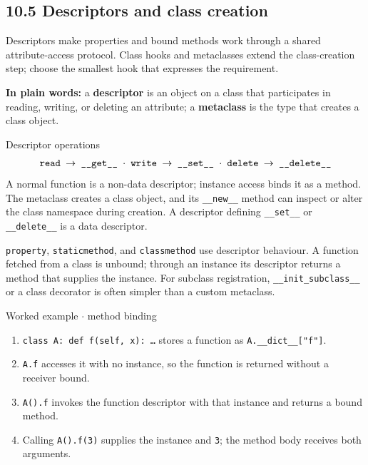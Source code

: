 \documentclass[11pt]{article}
\begin{document}
\begin{keepsection}
\section{10.5 Descriptors and class creation}

Descriptors make properties and bound methods work through a shared attribute-access protocol. Class hooks and metaclasses extend the class-creation step; choose the smallest hook that expresses the requirement.

\begin{plainbox}\textbf{In plain words:} a \textbf{descriptor} is an object on a class that participates in reading, writing, or deleting an attribute; a \textbf{metaclass} is the type that creates a class object.\end{plainbox}

\begin{equationcard}{Descriptor operations}
\[ \begin{gathered} \texttt{read \ensuremath{\to} \_\_get\_\_ \ensuremath{\cdot} write \ensuremath{\to} \_\_set\_\_ \ensuremath{\cdot} delete \ensuremath{\to} \_\_delete\_\_} \end{gathered} \]
{\small A normal function is a non-data descriptor; instance access binds it as a method. The metaclass creates a class object, and its \texttt{\_\_new\_\_} method can inspect or alter the class namespace during creation. A descriptor defining \texttt{\_\_set\_\_} or \texttt{\_\_delete\_\_} is a data descriptor.}
\end{equationcard}

\texttt{property}, \texttt{staticmethod}, and \texttt{classmethod} use descriptor behaviour. A function fetched from a class is unbound; through an instance its descriptor returns a method that supplies the instance. For subclass registration, \texttt{\_\_init\_subclass\_\_} or a class decorator is often simpler than a custom metaclass.

\begin{workedbox}{Worked example \ensuremath{\cdot} method binding}
\begin{enumerate}
\item \texttt{class A: def f(self, x): …} stores a function as \texttt{A.\_\_dict\_\_["f"]}.
\item \texttt{A.f} accesses it with no instance, so the function is returned without a receiver bound.
\item \texttt{A().f} invokes the function descriptor with that instance and returns a bound method.
\item Calling \texttt{A().f(3)} supplies the instance and \texttt{3}; the method body receives both arguments.
\end{enumerate}
\end{workedbox}


\end{keepsection}
\end{document}
